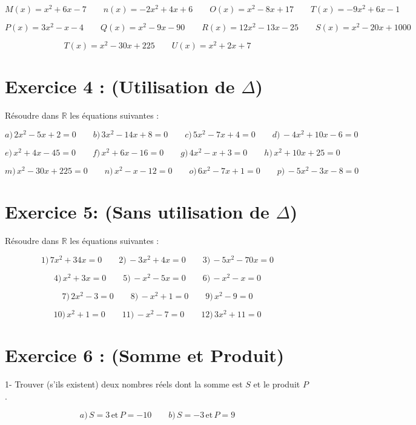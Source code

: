 \documentclass[12pt]{article}
\begin{document}
\[
M(x) = x^2 + 6x - 7 \quad\quad n(x) = -2x^2 + 4x + 6 \quad\quad O(x) = x^2 - 8x + 17 \quad\quad T(x) = -9x^2 + 6x - 1
\]

\[
P(x) = 3x^2 - x - 4 \quad\quad Q(x) = x^2 - 9x - 90 \quad\quad R(x) = 12x^2 - 13x - 25 \quad\quad S(x) = x^2 - 20x + 1000
\]

\[
T(x) = x^2 - 30x + 225 \quad\quad U(x) = x^2 + 2x + 7
\]

\section*{Exercice 4 : (Utilisation de \(\Delta\))}

Résoudre dans \(\mathbb{R}\) les équations suivantes :

\[
a) \, 2x^2 - 5x + 2 = 0 \quad\quad b) \, 3x^2 - 14x + 8 = 0 \quad\quad c) \, 5x^2 - 7x + 4 = 0 \quad\quad d) \, -4x^2 + 10x - 6 = 0
\]

\[
e) \, x^2 + 4x - 45 = 0 \quad\quad f) \, x^2 + 6x - 16 = 0 \quad\quad g) \, 4x^2 - x + 3 = 0 \quad\quad h) \, x^2 + 10x + 25 = 0
\]

\[
m) \, x^2 - 30x + 225 = 0 \quad\quad n) \, x^2 - x - 12 = 0 \quad\quad o) \, 6x^2 - 7x + 1 = 0 \quad\quad p) \, -5x^2 - 3x - 8 = 0
\]

\section*{Exercice 5: (Sans utilisation de \(\Delta\))}

Résoudre dans \(\mathbb{R}\) les équations suivantes :

\[
1) \, 7x^2 + 34x = 0 \quad\quad 2) \, -3x^2 + 4x = 0 \quad\quad 3) \, -5x^2 - 70x = 0
\]

\[
4) \, x^2 + 3x = 0 \quad\quad 5) \, -x^2 - 5x = 0 \quad\quad 6) \, -x^2 - x = 0
\]

\[
7) \, 2x^2 - 3 = 0 \quad\quad 8) \, -x^2 + 1 = 0 \quad\quad 9) \, x^2 - 9 = 0
\]

\[
10) \, x^2 + 1 = 0 \quad\quad 11) \, -x^2 - 7 = 0 \quad\quad 12) \, 3x^2 + 11 = 0
\]

\section*{Exercice 6 : (Somme et Produit)}

1- Trouver (s’ils existent) deux nombres réels dont la somme est \( S \) et le produit \( P \).

\[
a) \, S = 3 \, \text{et} \, P = -10 \quad\quad b) \, S = -3 \, \text{et} \, P = 9
\]
\end{document}
